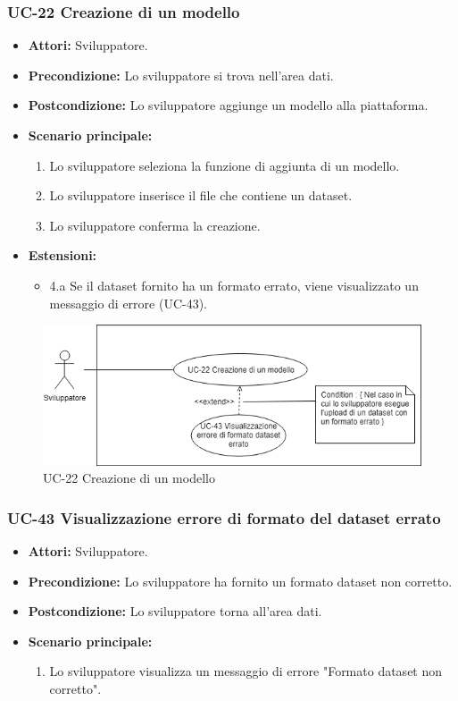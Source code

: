 	\subsubsection{UC-22 Creazione di un modello}		
		\begin{itemize}
			\item \textbf{Attori:} Sviluppatore.
			\item \textbf{Precondizione:} Lo sviluppatore si trova nell'area dati.
			\item \textbf{Postcondizione:} Lo sviluppatore aggiunge un modello alla piattaforma.
			\item \textbf{Scenario principale:}
			\begin{enumerate}
				\item Lo sviluppatore seleziona la funzione di aggiunta di un modello.
				\item Lo sviluppatore inserisce il file che contiene un dataset.
				\item Lo sviluppatore conferma la creazione.
			\end{enumerate}
			\item \textbf{Estensioni:}
				\begin{itemize}
					\item 4.a Se il dataset fornito ha un formato errato, viene visualizzato un messaggio di errore (UC-43).
				\end{itemize}
		\end{itemize}
		
		\begin{figure}[h]
			\centering
			\includegraphics[scale=0.7]{images/UC-22.png}
				\caption{UC-22 Creazione di un modello}
		\end{figure}	
	
	\subsubsection{UC-43 Visualizzazione errore di formato del dataset errato}	
	\begin{itemize}					
			\item \textbf{Attori:} Sviluppatore.
			\item \textbf{Precondizione:} Lo sviluppatore ha fornito un formato dataset non corretto.
			\item \textbf{Postcondizione:} Lo sviluppatore torna all'area dati.
			\item \textbf{Scenario principale:}
				\begin{enumerate}
					\item Lo sviluppatore visualizza un messaggio di errore "Formato dataset non corretto".
				\end{enumerate}	
		\end{itemize}		
	
